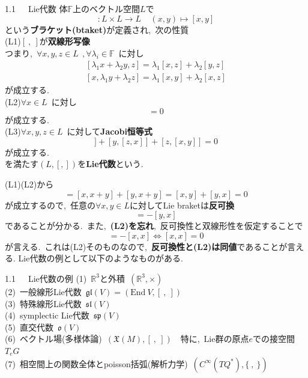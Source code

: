 \documentclass[uplatex,dvipdfmx]{jsarticle}
\begin{document}
\begin{mydef}{1.1~~~Lie代数}
    体$\mathbb{F}$上のベクトル空間$L$で
    \begin{equation*}
        [~,~]:L\times L\to L~~~~~(x,y)\mapsto [x,y]
    \end{equation*}
    という\textbf{ブラケット(btaket)}が定義され,~次の性質\\
    (L1)$[~,~]$が\textbf{双線形写像}\\
    つまり,~$\forall x,y,z\in L~~,\forall\lambda_i\in \mathbb{F}$~に対し
    \begin{equation*}
    \begin{split}
        [\lambda_1 x+\lambda_2 y,z] = \lambda_1[x,z]+\lambda_2 [y,z]\\
        [x,\lambda_1y+\lambda_2z]=\lambda_1[x,y]+\lambda_2[x,z]
    \end{split}
    \end{equation*}
    が成立する.\\
    (L2)$\forall x\in L$~に対し
    \begin{equation*}
        [x,x]=0
    \end{equation*}
    が成立する.\\
    (L3)$\forall x,y,z\in L$~に対して\textbf{Jacobi恒等式}
    \begin{equation*}
        [x,[y,z]]+[y,[z,x]]+[z,[x,y]]=0
    \end{equation*}
    が成立する.\\
    を満たす$(L,[,])$を\textbf{Lie代数}という.
\end{mydef}
(L1)(L2)から
\begin{equation*}
    [x+y,x+y]=[x,x+y]+[y,x+y]=[x,y]+[y,x]=0
\end{equation*}
が成立するので,~任意の$\forall x,y\in L $に対してLie braketは\textbf{反可換}
\begin{equation*}
    [x,y]=-[y,x]
\end{equation*}
であることが分かる.~また,~\textbf{(L2)を忘れ},~反可換性と双線形性を仮定することで
\begin{equation*}
    [x,x]=-[x,x]\Leftrightarrow[x,x]=0
\end{equation*}
が言える.~これは(L2)そのものなので,~\textbf{反可換性と(L2)は同値}であることが言える.
\newpage
Lie代数の例として以下のようなものがある.
\begin{myex}{1.1~~~Lie代数の例}
    (1)~$\mathbb{R}^3$と外積~$(\mathbb{R}^3,\times)$\\
    (2)~一般線形Lie代数~$\mathfrak{gl}(V)=(\text{End}~V,[~,~])$\\
    (3)~特殊線形Lie代数~$\mathfrak{sl}(V)$\\
    (4)~symplectic Lie代数~$\mathfrak{sp}(V)$\\
    (5)~直交代数~$\mathfrak{o}(V)$\\
    (6)~ベクトル場(多様体論)~$(\mathfrak{X}(M),[~,~])$~~特に,~Lie群の原点$e$での接空間$T_eG$\\
    (7)~相空間上の関数全体とpoisson括弧(解析力学)~$(C^\infty(TQ^*),\{~,~\})$
\end{myex}
\end{document}
